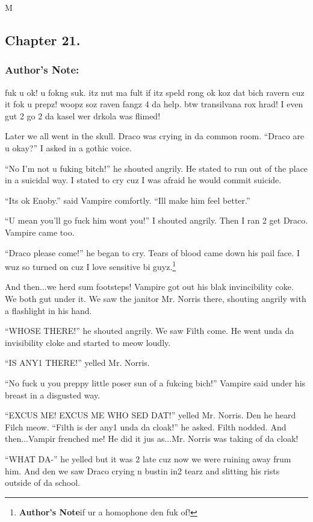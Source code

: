 M\documentclass{article}
\begin{document}
\clearpage\nolinenumbers
\subsection*{Chapter 21.}

\subsubsection*{Author's Note: }fuk u ok! u fokng suk. itz nut ma fult if itz speld rong ok koz dat bich ravern cuz it fok u prepz! woopz soz raven fangz 4 da help. btw transilvana rox hrad! I even gut 2 go 2 da kasel wer drkola was flimed!

\textbreak
\linenumbers\resetlinenumber

Later we all went in the skull. Draco was crying in da common room. “Draco are u okay?” I asked in a gothic voice.

“No I’m not u fuking bitch!” he shouted angrily. He stated to run out of the place in a suicidal way. I stated to cry cuz I was afraid he would commit suicide.

“Its ok Enoby.” said Vampire comfortly. “Ill make him feel better.”

“U mean you’ll go fuck him wont you!” I shouted angrily. Then I ran 2 get Draco. Vampire came too.

“Draco please come!” he began to cry. Tears of blood came down his pail face. I wuz so turned on cuz I love sensitive bi guyz.\footnote{\textbf{Author's Note}if ur a homophone den fuk of!}

And then...we herd sum footsteps! Vampire got out his blak invincibility coke. We both gut under it. We saw the janitor Mr. Norris there, shouting angrily with a flashlight in his hand.

“WHOSE THERE!” he shouted angrily. We saw Filth come. He went unda da invisibility cloke and started to meow loudly.

“IS ANY1 THERE!” yelled Mr. Norris.

“No fuck u you preppy little poser sun of a fukcing bich!” Vampire said under his breast in a disgusted way.

“EXCUS ME! EXCUS ME WHO SED DAT!” yelled Mr. Norris. Den he heard Filch meow. “Filth is der any1 unda da cloak!” he asked. Filth nodded. And then...Vampir frenched me! He did it jus as...Mr. Norris was taking of da cloak!

“WHAT DA-” he yelled but it was 2 late cuz now we were ruining away frum him. And den we saw Draco crying n bustin in2 tearz and slitting his rists outside of da school.
\end{document}
